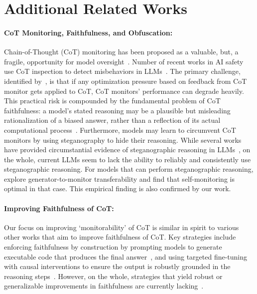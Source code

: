 \documentclass{article}
\newcommand{\ua}[1]{\iftoggle{showua}{\textcolor{blue}{#1}}{}}
\theoremstyle{plain}
\begin{document}

\FloatBarrier
\clearpage
\section{Additional Related Works}
\label{appx:related-works}
\paragraph{CoT Monitoring, Faithfulness, and Obfuscation:}
Chain-of-Thought (CoT) monitoring has been proposed as a valuable, but, a fragile, opportunity for model oversight~\citep{korbak2025chainthoughtmonitorabilitynew}.
Number of recent works in AI safety use CoT inspection to detect misbehaviors in LLMs~\citep{scheurer2024largelanguagemodelsstrategically,greenblatt2024alignmentfakinglargelanguage, meinke2025frontiermodelscapableincontext}.
The primary challenge, identified by~\citep{baker2025monitoringreasoningmodelsmisbehavior}, is that if any optimization pressure based on feedback from CoT monitor gets applied to CoT, CoT monitors' performance can degrade heavily.
This practical risk is compounded by the fundamental problem of CoT faithfulness: a model's stated reasoning may be a plausible but misleading rationalization of a biased answer, rather than a reflection of its actual computational process~\citep{turpin2023languagemodelsdontsay, lanham2023measuringfaithfulnesschainofthoughtreasoning,chen2025reasoningmodelsdontsay,arcuschin2025chain}.
Furthermore, models may learn to circumvent CoT monitors by using steganography to hide their reasoning.
While several works have provided circumstantial evidence of steganographic reasoning in LLMs~\citep{farquhar2025monamyopicoptimizationnonmyopic,motwani2024secretcollusion,mathew2024hiddenplaintextemergence,zolkowski2025early,skaf2025large},
on the whole, current LLMs seem to lack the ability to reliably and consistently use steganographic reasoning.
For models that can perform steganographic reasoning, \citet{cooper2025gendistransfer} explore generator-to-monitor transferability and find that self-monitoring is optimal in that case.
This empirical finding is also confirmed by our work.


\paragraph{Improving Faithfulness of CoT:}
Our focus on improving `monitorability' of CoT is similar in spirit to various other works that aim to improve faithfulness of CoT.
Key strategies include enforcing faithfulness by construction by prompting models to generate executable code that produces the final answer~\citep{lyu2023faithful}, and using targeted fine-tuning with causal interventions to ensure the output is robustly grounded in the reasoning steps~\citep{paul2024making,akchurin2025frit}.
However, on the whole, strategies that yield robust or generalizable improvements in faithfulness are currently lacking~\citep{tanneru2024limits}.
\end{document}
